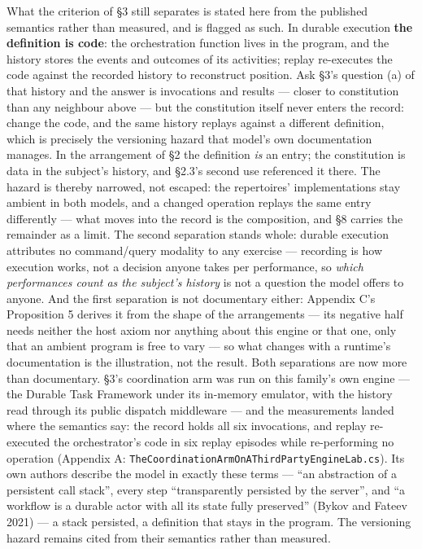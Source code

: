 \documentclass[
]{article}
\begin{document}
What the criterion of §3 still separates is stated here from the
published semantics rather than measured, and is flagged as such. In
durable execution \textbf{the definition is code}: the orchestration
function lives in the program, and the history stores the events and
outcomes of its activities; replay re-executes the code against the
recorded history to reconstruct position. Ask §3's question (a) of that
history and the answer is invocations and results --- closer to
constitution than any neighbour above --- but the constitution itself
never enters the record: change the code, and the same history replays
against a different definition, which is precisely the versioning hazard
that model's own documentation manages. In the arrangement of §2 the
definition \emph{is} an entry; the constitution is data in the subject's
history, and §2.3's second use referenced it there. The hazard is
thereby narrowed, not escaped: the repertoires' implementations stay
ambient in both models, and a changed operation replays the same entry
differently --- what moves into the record is the composition, and §8
carries the remainder as a limit. The second separation stands whole:
durable execution attributes no command/query modality to any exercise
--- recording is how execution works, not a decision anyone takes per
performance, so \emph{which performances count as the subject's history}
is not a question the model offers to anyone. And the first separation
is not documentary either: Appendix C's Proposition 5 derives it from
the shape of the arrangements --- its negative half needs neither the
host axiom nor anything about this engine or that one, only that an
ambient program is free to vary --- so what changes with a runtime's
documentation is the illustration, not the result. Both separations are
now more than documentary. §3's coordination arm was run on this
family's own engine --- the Durable Task Framework under its in-memory
emulator, with the history read through its public dispatch middleware
--- and the measurements landed where the semantics say: the record
holds all six invocations, and replay re-executed the orchestrator's
code in six replay episodes while re-performing no operation (Appendix
A: \texttt{TheCoordinationArmOnAThirdPartyEngineLab.cs}). Its own
authors describe the model in exactly these terms --- ``an abstraction
of a persistent call stack'', every step ``transparently persisted by
the server'', and ``a workflow is a durable actor with all its state
fully preserved'' (Bykov and Fateev 2021) --- a stack persisted, a
definition that stays in the program. The versioning hazard remains
cited from their semantics rather than measured.
\end{document}
